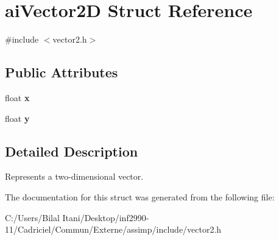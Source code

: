 \hypertarget{structai_vector2_d}{}\section{ai\+Vector2D Struct Reference}
\label{structai_vector2_d}


{\ttfamily \#include $<$vector2.\+h$>$}

\subsection*{Public Attributes}
\begin{DoxyCompactItemize}
\item 
float {\bfseries x}\hypertarget{structai_vector2_d_a968e4db235e054f58b4c320576d82740}{}\label{structai_vector2_d_a968e4db235e054f58b4c320576d82740}

\item 
float {\bfseries y}\hypertarget{structai_vector2_d_a7bb1686f941459496627a3b8ce68e73f}{}\label{structai_vector2_d_a7bb1686f941459496627a3b8ce68e73f}

\end{DoxyCompactItemize}


\subsection{Detailed Description}
Represents a two-\/dimensional vector. 

The documentation for this struct was generated from the following file\+:\begin{DoxyCompactItemize}
\item 
C\+:/\+Users/\+Bilal Itani/\+Desktop/inf2990-\/11/\+Cadriciel/\+Commun/\+Externe/assimp/include/vector2.\+h\end{DoxyCompactItemize}
